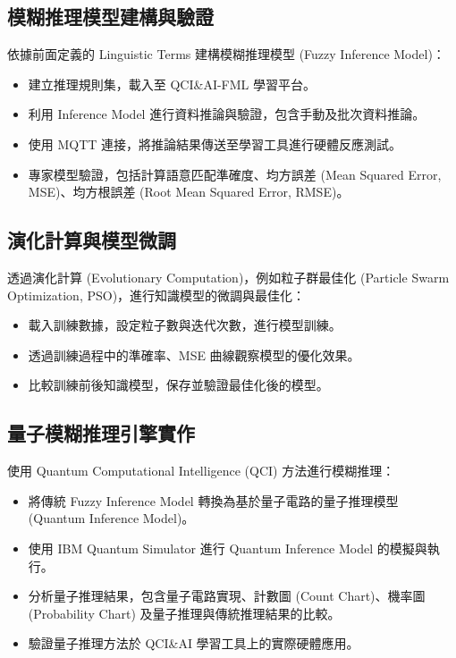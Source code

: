 \documentclass[twocolumn,11pt,a4paper]{article}
\begin{document}
\subsection{模糊推理模型建構與驗證}
依據前面定義的 Linguistic Terms 建構模糊推理模型 (Fuzzy Inference Model)：
\begin{itemize}
    \item 建立推理規則集，載入至 QCI\&AI-FML 學習平台。
    \item 利用 Inference Model 進行資料推論與驗證，包含手動及批次資料推論。
    \item 使用 MQTT 連接，將推論結果傳送至學習工具進行硬體反應測試。
    \item 專家模型驗證，包括計算語意匹配準確度、均方誤差 (Mean Squared Error, MSE)、均方根誤差 (Root Mean Squared Error, RMSE)。
\end{itemize}

\subsection{演化計算與模型微調}
透過演化計算 (Evolutionary Computation)，例如粒子群最佳化 (Particle Swarm Optimization, PSO)，進行知識模型的微調與最佳化：
\begin{itemize}
    \item 載入訓練數據，設定粒子數與迭代次數，進行模型訓練。
    \item 透過訓練過程中的準確率、MSE 曲線觀察模型的優化效果。
    \item 比較訓練前後知識模型，保存並驗證最佳化後的模型。
\end{itemize}

\subsection{量子模糊推理引擎實作}
使用 Quantum Computational Intelligence (QCI) 方法進行模糊推理：
\begin{itemize}
    \item 將傳統 Fuzzy Inference Model 轉換為基於量子電路的量子推理模型 (Quantum Inference Model)。
    \item 使用 IBM Quantum Simulator 進行 Quantum Inference Model 的模擬與執行。
    \item 分析量子推理結果，包含量子電路實現、計數圖 (Count Chart)、機率圖 (Probability Chart) 及量子推理與傳統推理結果的比較。
    \item 驗證量子推理方法於 QCI\&AI 學習工具上的實際硬體應用。
\end{itemize}
\end{document}
